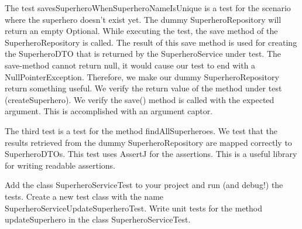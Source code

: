 The test savesSuperheroWhenSuperheroNameIsUnique is a test for the scenario where the superhero doesn't exist yet.
The dummy SuperheroRepository will return an empty Optional.  While executing the test, the save method of the SuperheroRepository is called.  The result of this save method is used for creating the SuperheroDTO that is returned by the SuperheroService under test.
The save-method cannot return null, it would cause our test to end with a NullPointerException. Therefore, we make our dummy SuperheroRepository return something useful. We verify the return value of the method under test (createSuperhero). We verify the save() method is called with the expected argument.  This is accomplished with an argument captor. 

The third test is a test for the method findAllSuperheroes.  We test that the results retrieved from the dummy SuperheroRepository are mapped correctly to SuperheroDTOs.  This test uses AssertJ for the assertions. This is a useful library for writing readable assertions. 
 
\begin{oefening}
Add the class SuperheroServiceTest to your project and run (and debug!) the tests. 
Create a new test class with the name SuperheroServiceUpdateSuperheroTest.
Write unit tests for the method updateSuperhero in the class SuperheroServiceTest. 
\end{oefening}
 
 
 
 
 
 
